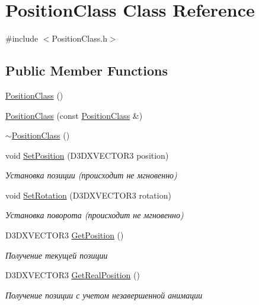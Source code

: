 \hypertarget{class_position_class}{}\section{Position\+Class Class Reference}
\label{class_position_class}


{\ttfamily \#include $<$Position\+Class.\+h$>$}

\subsection*{Public Member Functions}
\begin{DoxyCompactItemize}
\item 
\hyperlink{class_position_class_a830ac0c2129c3eed555e5d8dfa8615f0}{Position\+Class} ()
\item 
\hyperlink{class_position_class_a1dab30bc7383d297338c30feaf114b1f}{Position\+Class} (const \hyperlink{class_position_class}{Position\+Class} \&)
\item 
\hyperlink{class_position_class_a39bd95edb5d298465c173143b193a5ad}{$\sim$\+Position\+Class} ()
\item 
void \hyperlink{class_position_class_a58b43a83d2cae0db050dda8fcd2dd5c7}{Set\+Position} (D3\+D\+X\+V\+E\+C\+T\+O\+R3 position)
\begin{DoxyCompactList}\small\item\em Установка позиции (происходит не мгновенно) \end{DoxyCompactList}\item 
void \hyperlink{class_position_class_ab4924d608eb5db276a3320019b695343}{Set\+Rotation} (D3\+D\+X\+V\+E\+C\+T\+O\+R3 rotation)
\begin{DoxyCompactList}\small\item\em Установка поворота (происходит не мгновенно) \end{DoxyCompactList}\item 
D3\+D\+X\+V\+E\+C\+T\+O\+R3 \hyperlink{class_position_class_aa824239d761127efe43d1718f1e68b79}{Get\+Position} ()
\begin{DoxyCompactList}\small\item\em Получение текущей позиции \end{DoxyCompactList}\item 
D3\+D\+X\+V\+E\+C\+T\+O\+R3 \hyperlink{class_position_class_acbd3167d621af1d35496b7be3347165a}{Get\+Real\+Position} ()
\begin{DoxyCompactList}\small\item\em Получение позиции с учетом незавершенной анимации \end{DoxyCompactList}\item 

\end{DoxyCompactItemize}
